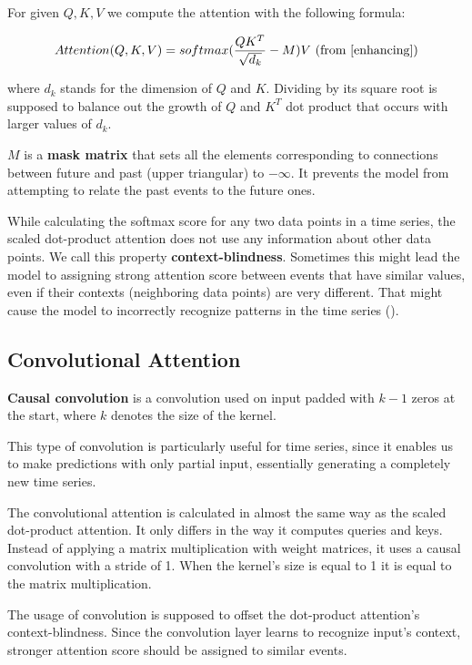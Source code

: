 \documentclass[en]{pracamgr}
\newcommand{\pk}[1]{\textcolor{red}{\small [pk: #1]}}
\begin{document}
	For given $Q, K, V$ we compute the attention with the following formula:
	
	$$ Attention(Q, K, V) = softmax(\frac{QK^{T}}{\sqrt{d_k}} - M)V \textrm{ (from \cite{enhancing})} $$
	
	where $d_k$ stands for the dimension of $Q$ and $K$. Dividing by its square root is supposed to balance out the growth of $Q$ and $K^{T}$ dot product that occurs with larger values of $d_k$.
	
	$M$ is a \textbf{mask matrix} that sets all the elements corresponding to connections between future and past (upper triangular) to $-\infty$. It prevents the model from attempting to relate the past events to the future ones.
	
	While calculating the softmax score for any two data points in a time series, the scaled dot-product attention does not use any information about other data points. We call this property \textbf{context-blindness}. Sometimes this might lead the model to assigning strong attention score between events that have similar values, even if their contexts (neighboring data points) are very different. That might cause the model to incorrectly recognize patterns in the time series (\cite{enhancing}). %
	
	\subsection{Convolutional Attention}

	\textbf{Causal convolution} is a convolution used on input padded with $k - 1$ zeros at the start, where $k$ denotes the size of the kernel.
		
	This type of convolution is particularly useful for time series, since it enables us to make predictions with only partial input, essentially generating a completely new time series.
	\newline
	
	The convolutional attention \cite{enhancing} is calculated in almost the same way as the scaled dot-product attention. 
	It only differs in the way it computes queries and keys.
	Instead of applying a matrix multiplication with weight matrices, it uses a causal convolution with a stride of 1. When the kernel's size is equal to 1 it is equal to the matrix multiplication.
	
	The usage of convolution is supposed to offset the dot-product attention's context-blindness. Since the convolution layer learns to recognize input's context, stronger attention score should be assigned to similar events.
	
\end{document}
